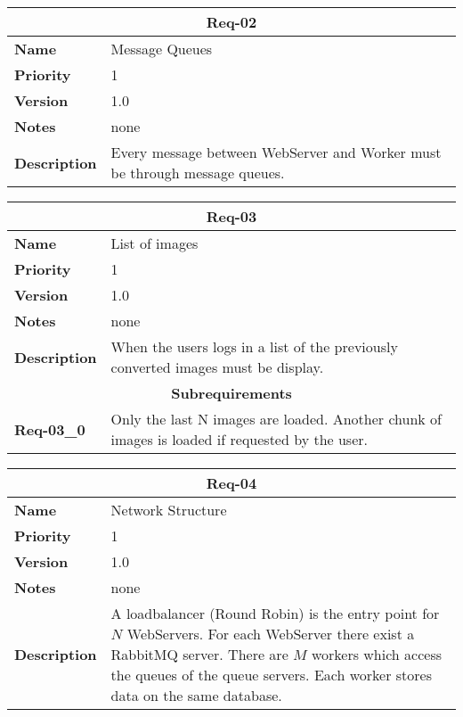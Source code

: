 \documentclass[../documentation.tex]{subfiles}
\begin{document}
\bgroup{}
\def\arraystretch{1.25}
\begin{center}
    \begin{tabular}{ |l|p{9cm}| }
        \hline
        \multicolumn{2}{|c|}{\textbf{Req-02}} \\
        \hline
        \textbf{Name} & Message Queues \\
        \hline
        \textbf{Priority} & 1 \\
        \hline
        \textbf{Version} & 1.0 \\
        \hline
        \textbf{Notes} & none \\
        \hline
        \textbf{Description} & Every message between WebServer and Worker must be through message queues. \\
        \hline
    \end{tabular}
\end{center}
\egroup{}

\bgroup{}
\def\arraystretch{1.25}
\begin{center}
    \begin{tabular}{ |l|p{9cm}| }
        \hline
        \multicolumn{2}{|c|}{\textbf{Req-03}} \\
        \hline
        \textbf{Name} & List of images \\
        \hline
        \textbf{Priority} & 1 \\
        \hline
        \textbf{Version} & 1.0 \\
        \hline
        \textbf{Notes} & none \\
        \hline
        \textbf{Description} & When the users logs in a list of the previously converted images must be display. \\
        \hline
        \multicolumn{2}{|c|}{\textbf{Subrequirements}} \\
        \hline
        \textbf{Req-03\_0} & Only the last N images are loaded. Another chunk of images is loaded if requested by the user. \\
        \hline
    \end{tabular}
\end{center}
\egroup{}

\bgroup{}
\def\arraystretch{1.25}
\begin{center}
    \begin{tabular}{ |l|p{9cm}| }
        \hline
        \multicolumn{2}{|c|}{\textbf{Req-04}} \\
        \hline
        \textbf{Name} & Network Structure \\
        \hline
        \textbf{Priority} & 1 \\
        \hline
        \textbf{Version} & 1.0 \\
        \hline
        \textbf{Notes} & none \\
        \hline
        \textbf{Description} & A loadbalancer (Round Robin) is the entry point for \(N\) WebServers.
        For each WebServer there exist a RabbitMQ server. There are \(M\) workers which access the queues of the queue servers.
        Each worker stores data on the same database. \\
        \hline
    \end{tabular}
\end{center}
\egroup{}
\end{document}
